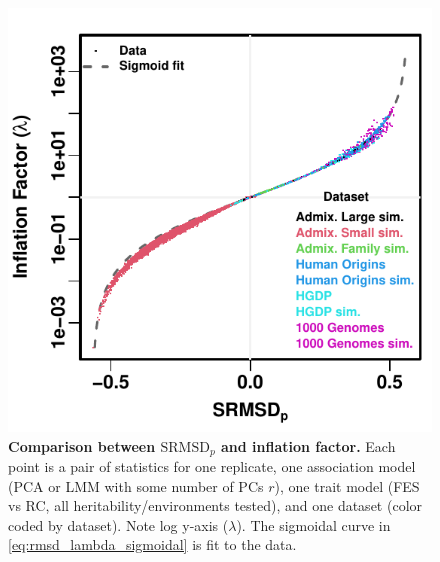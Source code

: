 \documentclass[11pt]{article}
\newcommand{\rmsd}{\text{SRMSD}_p}
\begin{document}
\begin{figure}[hp!]
  \centering
  \includegraphics{sum-rmsd-vs-lambda.pdf}
  \caption{
    {\bf Comparison between $\rmsd$ and inflation factor.}
    Each point is a pair of statistics for one replicate, one association model (PCA or LMM with some number of PCs $r$), one trait model (FES vs RC, all heritability/environments tested), and one dataset (color coded by dataset).
    Note log y-axis ($\lambda$).
    The sigmoidal curve in \cref{eq:rmsd_lambda_sigmoidal} is fit to the data.
  }
  \label{fig:rmsd_lambda}
\end{figure}
\end{document}
